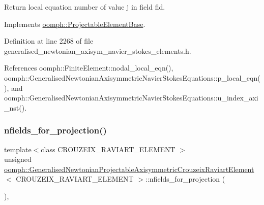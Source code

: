 Return local equation number of value j in field fld. 



Implements \hyperlink{classoomph_1_1ProjectableElementBase_ac5c27ae929ff636dc7747fe23fd4f738}{oomph\+::\+Projectable\+Element\+Base}.



Definition at line 2268 of file generalised\+\_\+newtonian\+\_\+axisym\+\_\+navier\+\_\+stokes\+\_\+elements.\+h.



References oomph\+::\+Finite\+Element\+::nodal\+\_\+local\+\_\+eqn(), oomph\+::\+Generalised\+Newtonian\+Axisymmetric\+Navier\+Stokes\+Equations\+::p\+\_\+local\+\_\+eqn(), and oomph\+::\+Generalised\+Newtonian\+Axisymmetric\+Navier\+Stokes\+Equations\+::u\+\_\+index\+\_\+axi\+\_\+nst().

\mbox{\label{classoomph_1_1GeneralisedNewtonianProjectableAxisymmetricCrouzeixRaviartElement_adb32f53c8b407273afcd7eb95a1dbb54}} 
\subsubsection{\texorpdfstring{nfields\+\_\+for\+\_\+projection()}{nfields\_for\_projection()}}
{\footnotesize\ttfamily template$<$class C\+R\+O\+U\+Z\+E\+I\+X\+\_\+\+R\+A\+V\+I\+A\+R\+T\+\_\+\+E\+L\+E\+M\+E\+NT $>$ \\
unsigned \hyperlink{classoomph_1_1GeneralisedNewtonianProjectableAxisymmetricCrouzeixRaviartElement}{oomph\+::\+Generalised\+Newtonian\+Projectable\+Axisymmetric\+Crouzeix\+Raviart\+Element}$<$ C\+R\+O\+U\+Z\+E\+I\+X\+\_\+\+R\+A\+V\+I\+A\+R\+T\+\_\+\+E\+L\+E\+M\+E\+NT $>$\+::nfields\+\_\+for\+\_\+projection (\begin{DoxyParamCaption}{ }\end{DoxyParamCaption})\hspace{0.3cm}{\ttfamily [inline]}, {\ttfamily [virtual]}}



